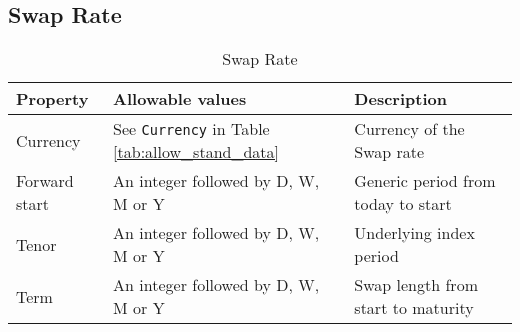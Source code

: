 




\subsection{Swap Rate}

\begin{table}[H]
\centering
\begin{tabular}{|p{3cm}|p{3.5cm}|p{7cm}|}
\hline
{\bf Property} & {\bf Allowable values} & {\bf Description} \\
\hline
Currency & See \lstinline!Currency! in Table \ref{tab:allow_stand_data} & Currency of the Swap rate\\ \hline
Forward start & An integer followed by D, W, M or Y & Generic period from today to start\\ \hline
Tenor & An integer followed by D, W, M or Y & Underlying index period \\ \hline
Term & An integer followed by D, W, M or Y & Swap length from start to maturity\\
\hline
\end{tabular}
  \caption{Swap Rate}
  \label{tab:swaprate_quote}
\end{table}


